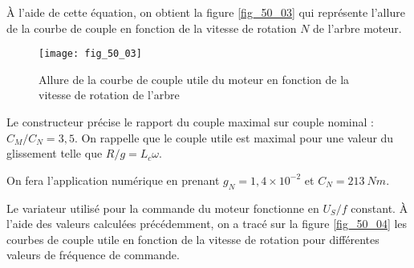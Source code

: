 \ifprof
\else
\fi

\ifprof
\else

À l’aide de cette équation, on obtient la figure \autoref{fig_50_03} qui représente l’allure de la courbe de
couple en fonction de la vitesse de rotation $N$ de l’arbre moteur.

\begin{figure}[H]
\centering
\texttt{[image: fig\_50\_03]}
\caption{Allure de la courbe de couple utile du moteur en fonction de la vitesse de
rotation de l’arbre \label{fig_50_03}}
\end{figure}
\fi

\ifprof
\else
\fi

\ifprof
\else

Le constructeur précise le rapport du couple maximal sur couple nominal : $C_M/C_N = 3,5$.
On rappelle que le couple utile est maximal pour une valeur du glissement telle que
$R/g = L_c\omega$.
\fi
{}
\ifprof
\else
\fi

\ifprof
\else
\fi

\ifprof
\else

\begin{rem}
On fera l’application numérique en prenant $g_N = 1,4 \times 10^{-2}$ et $C_N =\SI{213}{Nm}$.
\end{rem}

Le variateur utilisé pour la commande du moteur fonctionne en $U_S/f$ constant. À l’aide
des valeurs calculées précédemment, on a tracé sur la figure \autoref{fig_50_04}  les courbes de couple utile
en fonction de la vitesse de rotation pour différentes valeurs de fréquence de commande.

